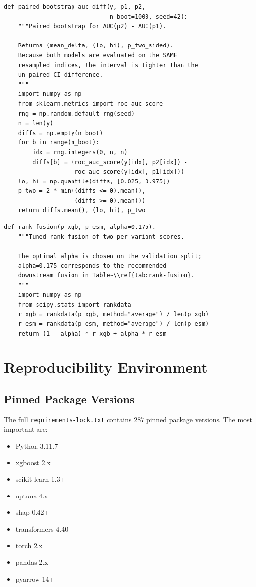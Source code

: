 \documentclass[11pt,a4paper,oneside]{report}
\begin{document}
\begin{lstlisting}[caption={Paired-bootstrap AUC-difference
helper (cf.\ EDIT~0.4 / D8).}]
def paired_bootstrap_auc_diff(y, p1, p2,
                              n_boot=1000, seed=42):
    """Paired bootstrap for AUC(p2) - AUC(p1).

    Returns (mean_delta, (lo, hi), p_two_sided).
    Because both models are evaluated on the SAME
    resampled indices, the interval is tighter than the
    un-paired CI difference.
    """
    import numpy as np
    from sklearn.metrics import roc_auc_score
    rng = np.random.default_rng(seed)
    n = len(y)
    diffs = np.empty(n_boot)
    for b in range(n_boot):
        idx = rng.integers(0, n, n)
        diffs[b] = (roc_auc_score(y[idx], p2[idx]) -
                    roc_auc_score(y[idx], p1[idx]))
    lo, hi = np.quantile(diffs, [0.025, 0.975])
    p_two = 2 * min((diffs <= 0).mean(),
                    (diffs >= 0).mean())
    return diffs.mean(), (lo, hi), p_two
\end{lstlisting}

\begin{lstlisting}[caption={Rank-fusion scoring function from
the ESM-2 experiment (\texttt{src/fusion.py}).}]
def rank_fusion(p_xgb, p_esm, alpha=0.175):
    """Tuned rank fusion of two per-variant scores.

    The optimal alpha is chosen on the validation split;
    alpha=0.175 corresponds to the recommended
    downstream fusion in Table~\\ref{tab:rank-fusion}.
    """
    import numpy as np
    from scipy.stats import rankdata
    r_xgb = rankdata(p_xgb, method="average") / len(p_xgb)
    r_esm = rankdata(p_esm, method="average") / len(p_esm)
    return (1 - alpha) * r_xgb + alpha * r_esm
\end{lstlisting}

\chapter{Reproducibility Environment}
\label{app:env}

\section{Pinned Package Versions}
The full \texttt{requirements-lock.txt} contains $287$
pinned package versions. The most important are:

\begin{itemize}
\item Python 3.11.7
\item xgboost 2.x
\item scikit-learn 1.3+
\item optuna 4.x
\item shap 0.42+
\item transformers 4.40+
\item torch 2.x
\item pandas 2.x
\item pyarrow 14+
\end{itemize}
\end{document}
